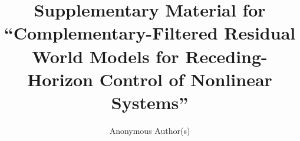 \documentclass[journal]{IEEEtran}
\title{Supplementary Material for ``Complementary-Filtered Residual World Models for Receding-Horizon Control of Nonlinear Systems''}
\author{Anonymous Author(s)}
\begin{document}
\maketitle
\appendices


\end{document}
